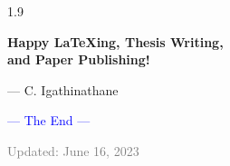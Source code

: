 \documentclass[phd]{ndsu-thesis-2022}
\newcommand\myspacing{1.9} %
\newcommand\italk[1]{\textcolor{blue}{#1}}  %
\begin{document}
\begin{spacing}{\myspacing}
\vspace{1cm}
\begin{center}
{\LARGE\bfseries
Happy {\LaTeX}ing, Thesis Writing, \\
and Paper Publishing!
}
\end{center}

\hfill {\footnotesize --- C. Igathinathane}
\closeappendices  %

\vspace{0.5in}
\begin{center}
\italk{--- The End ---}
\end{center}

\vfill
{\noindent\scriptsize\textcolor{gray}{Updated: June 16, 2023}}

\end{spacing}
\end{document}
